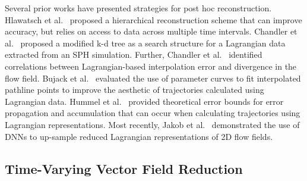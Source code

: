 Several prior works have presented strategies for post hoc reconstruction.
%
Hlawatsch et al.~\cite{hlawatsch2011hierarchical} proposed a hierarchical reconstruction scheme that can improve accuracy, but relies on access to data across multiple time intervals.
%
Chandler et al.~\cite{chandler2015interpolation} proposed a modified k-d tree as a search structure for a Lagrangian data extracted from an SPH simulation.
%
Further, Chandler et al.~\cite{chandler2016analysis} identified correlations between Lagrangian-based interpolation error and divergence in the flow field.
%
Bujack et al.~\cite{bujack2015lagrangian} evaluated the use of parameter curves to fit interpolated pathline points to improve the aesthetic of trajectories calculated using Lagrangian data.
%
Hummel et al.~\cite{hummel2016error} provided theoretical error bounds for error propagation and accumulation that can occur when calculating trajectories using Lagrangian representations. 
%
Most recently, Jakob et al.~\cite{Jakob20} demonstrated the use of DNNs to up-sample reduced Lagrangian representations of 2D flow fields. 


\subsection{Time-Varying Vector Field Reduction}
%
%
%
%

